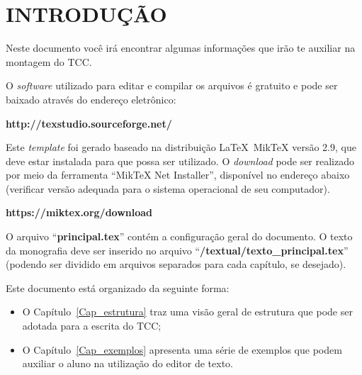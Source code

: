 \chapter{INTRODUÇÃO}

Neste documento você irá encontrar algumas informações que irão te auxiliar na montagem do \ac{TCC}.


O \textit{software} utilizado para editar e compilar os arquivos é gratuito e pode ser baixado através do endereço eletrônico: 

\textbf{http://texstudio.sourceforge.net/}

Este \emph{template} foi gerado baseado na distribuição \LaTeX~MikTeX versão 2.9, que deve estar instalada para que possa ser utilizado. O \emph{download} pode ser realizado por meio da ferramenta ``MikTeX Net Installer'', disponível no endereço abaixo (verificar versão adequada para o sistema operacional de seu computador).

\textbf{https://miktex.org/download}

O arquivo ``\textbf{principal.tex}'' contém a configuração geral do documento. O texto da monografia deve ser inserido no arquivo ``\textbf{/textual/texto\_principal.tex}'' (podendo ser dividido em arquivos separados para cada capítulo, se desejado).

Este documento está organizado da seguinte forma:
\begin{itemize}
	\item O Capítulo~\ref*{Cap_estrutura} traz uma visão geral de estrutura que pode ser adotada para a escrita do \ac{TCC};
	\item O Capítulo~\ref{Cap_exemplos} apresenta uma série de exemplos que podem auxiliar o aluno na utilização do editor de texto.
\end{itemize}


